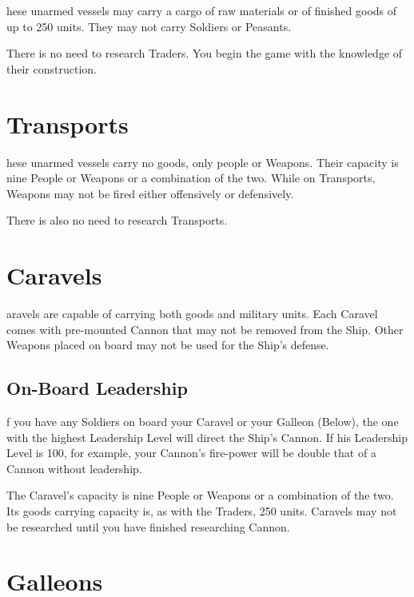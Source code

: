     
hese unarmed vessels may carry a cargo of raw materials or of finished goods of up to 250 units. They may not carry Soldiers or Peasants.

There is no need to research Traders. You begin the game with the knowledge of their construction.

\section{{Transports}}


hese unarmed vessels carry no goods, only people or Weapons. Their capacity is nine People or Weapons or a combination of the two. While on Transports, Weapons may not be fired either offensively or defensively.

There is also no need to research Transports.

\section{{Caravels}}


aravels are capable of carrying both goods and military units. Each Caravel comes with pre-mounted Cannon that may not be removed from the Ship. Other Weapons placed on board may not be used for the Ship’s defense.

\subsection{{On-Board Leadership}}

f you have any Soldiers on board your Caravel or your Galleon (Below), the one with the highest Leadership Level will direct the Ship’s Cannon. If his Leadership Level is 100, for example, your Cannon’s fire-power will be double that of a Cannon without leadership.

The Caravel’s capacity is nine People or Weapons or a combination of the two. Its goods carrying capacity is, as with the Traders, 250 units. Caravels may not be researched until you have finished researching Cannon.

\section{{Galleons}}

